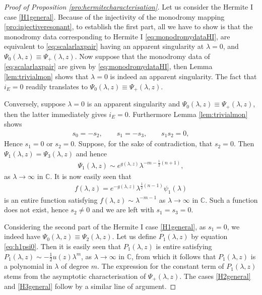 \documentclass[pdftex]{sigma}
\numberwithin{equation}{section}
\begin{document}
\begin{proof}[Proof of Proposition \ref{pro:hermitecharacterisation}]
Let us consider the Hermite I case \ref{H1general}. Because of the injectivity of the monodromy mapping \ref{pro:injectiveresonant}, to establish the f\/irst part, all we have to show is that the monodromy data corresponding to Hermite I \eqref{eq:monodromydataHI},
are equivalent to \eqref{eq:scalarlaxpair} having an apparent singularity at $\lambda=0$, and $\Psi_0(\lambda,z)\equiv \Psi_{+}(\lambda,z)$. Now suppose that the monodromy data of \eqref{eq:scalarlaxpair} are given by \eqref{eq:monodromydataHI}, then Lemma \ref{lem:trivialmon} shows that $\lambda=0$ is indeed an apparent singularity. The fact that $i_E=0$ readily translates to $\Psi_0(\lambda,z)\equiv \Psi_{+}(\lambda,z)$.

Conversely, suppose $\lambda=0$ is an apparent singularity and $\Psi_0(\lambda,z)\equiv \Psi_{+}(\lambda,z)$, then the latter immediately gives $i_E=0$. Furthermore Lemma \ref{lem:trivialmon} shows
 \begin{gather*}%
 s_0=-s_2,\qquad s_1=-s_3,\qquad s_1s_2=0,
 \end{gather*}
 Hence $s_1=0$ or $s_2=0$. Suppose, for the sake of contradiction, that $s_2=0$. Then $\Psi_1(\lambda,z)=\Psi_3(\lambda,z)$ and hence
 \begin{gather*}
 \Psi_1(\lambda,z)\sim e^{g(\lambda,z)}\lambda^{-m-\frac{1}{2}(n+1)},
 \end{gather*}
 as $\lambda\rightarrow \infty$ in $\mathbb{C}$.
 It is now easily seen that
 \begin{gather*}
 f(\lambda,z)=e^{-g(\lambda,z)} \lambda^{\frac{1}{2}(n-1)}\psi_1(\lambda)
 \end{gather*}
 is an entire function satisfying $f(\lambda,z)\sim \lambda^{-m-1}$ as $\lambda\rightarrow \infty$ in $\mathbb{C}$. Such a function does not exist, hence $s_2\neq 0$ and we are left with $s_1=s_3=0$.

 Considering the second part of the Hermite I case \ref{H1general}, as $s_1=0$, we indeed have $\Psi_0(\lambda,z)\equiv \Psi_2(\lambda,z)$. Let us def\/ine $P_1(\lambda,z)$ by equation \eqref{eq:h1psi0}. Then it is easily seen that $P_1(\lambda,z)$ is entire satisfying $P_1(\lambda,z)\sim -\tfrac{1}{2}u(z)\lambda^m$, as $\lambda\rightarrow \infty$ in $\mathbb{C}$, from which it follows that $P_1(\lambda,z)$ is a polynomial in $\lambda$ of degree $m$. The expression for the constant term of $P_1(\lambda,z)$ stems from the asymptotic characterisation of $\Psi_+(\lambda,z)$.
The cases \ref{H2general} and \ref{H3general} follow by a similar line of argument.
\end{proof}
\end{document}
